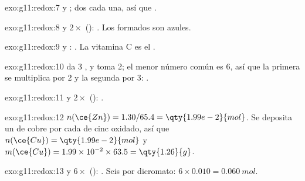 \begin{solution}{exo:g11:redox:7}
 y ; dos 
cada una, así que .
\end{solution}

\begin{solution}{exo:g11:redox:8}
 y $2\times$ ():
. Los   formados son
azules.
\end{solution}

\begin{solution}{exo:g11:redox:9}
 y :
. La vitamina C es el .
\end{solution}

\begin{solution}{exo:g11:redox:10}
 da 3 , y 
toma 2; el menor número común es 6, así que la primera se multiplica por
2 y la segunda por 3: .
\end{solution}

\begin{solution}{exo:g11:redox:11}
 y $2\times$ ():
.
\end{solution}

\begin{solution}{exo:g11:redox:12}
$n(\ce{Zn}) = 1.30/65.4 = \qty{1.99e-2}{mol}$. Se deposita un  de
cobre por cada  de cinc oxidado, así que
$n(\ce{Cu}) = \qty{1.99e-2}{mol}$ y
$m(\ce{Cu}) = 1.99\times 10^{-2} \times 63.5 = \qty{1.26}{g}$.
\end{solution}

\begin{solution}{exo:g11:redox:13}
 y
$6\times$ ():
.
Seis  por  dicromato: $6 \times 0.010 = \qty{0.060}{mol}$.
\end{solution}

